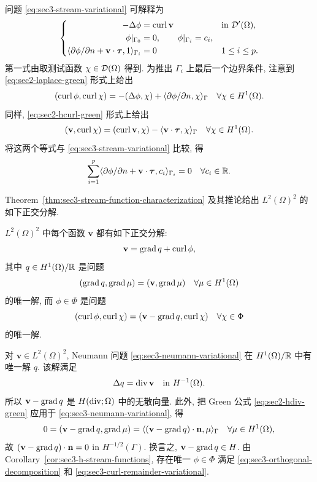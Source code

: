 \setcounter{statement}{0}
\begin{Remark}\label{rem:sec3-stream-boundary-problem}
问题 \eqref{eq:sec3-stream-variational} 可解释为
\[
\left\{\begin{aligned}
  -\Delta\phi&=\operatorname{curl}\mathbf v&&\text{in }\mathcal{D}'(\Omega),\\
  \phi|_{\Gamma_0}&=0,\qquad \phi|_{\Gamma_i}=c_i,\\
  \langle\partial\phi/\partial n+\mathbf v\cdot\boldsymbol\tau,1\rangle_{\Gamma_i}
    &=0&&1\le i\le p.
\end{aligned}\right.
\]
第一式由取测试函数 $\chi\in\mathcal{D}(\Omega)$ 得到. 为推出 $\Gamma_i$ 上最后一个边界条件,
注意到 \eqref{eq:sec2-laplace-green} 形式上给出
\[
  (\operatorname{curl}\phi,\operatorname{curl}\chi)=-(\Delta\phi,\chi)
  +\langle\partial\phi/\partial n,\chi\rangle_\Gamma
  \quad\forall\chi\in H^1(\Omega).
\]
同样, \eqref{eq:sec2-hcurl-green} 形式上给出
\[
  (\mathbf v,\operatorname{curl}\chi)=(\operatorname{curl}\mathbf v,\chi)
  -\langle\mathbf v\cdot\boldsymbol\tau,\chi\rangle_\Gamma
  \quad\forall\chi\in H^1(\Omega).
\]
将这两个等式与 \eqref{eq:sec3-stream-variational} 比较, 得
\[
  \sum_{i=1}^{p}
  \langle\partial\phi/\partial n+\mathbf v\cdot\boldsymbol\tau,c_i\rangle_{\Gamma_i}=0
  \quad\forall c_i\in\mathbb{R}.
\]
\end{Remark}

Theorem~\ref{thm:sec3-stream-function-characterization} 及其推论给出
$L^2(\Omega)^2$ 的如下正交分解.

\setcounter{statement}{1}
\begin{Theorem}\label{thm:sec3-orthogonal-decomposition}
$L^2(\Omega)^2$ 中每个函数 $\mathbf v$ 都有如下正交分解:
\begin{equation}\label{eq:sec3-orthogonal-decomposition}
  \mathbf v=\operatorname{grad} q+\operatorname{curl}\phi,
\end{equation}
其中 $q\in H^1(\Omega)/\mathbb{R}$ 是问题
\begin{equation}\label{eq:sec3-neumann-variational}
  (\operatorname{grad} q,\operatorname{grad}\mu)=(\mathbf v,\operatorname{grad}\mu)
  \quad\forall\mu\in H^1(\Omega)
\end{equation}
的唯一解, 而 $\phi\in\Phi$ 是问题
\begin{equation}\label{eq:sec3-curl-remainder-variational}
  (\operatorname{curl}\phi,\operatorname{curl}\chi)=(\mathbf v-\operatorname{grad} q,\operatorname{curl}\chi)
  \quad\forall\chi\in\Phi
\end{equation}
的唯一解.
\end{Theorem}

\begin{Proof}
对 $\mathbf v\in L^2(\Omega)^2$, Neumann 问题
\eqref{eq:sec3-neumann-variational} 在 $H^1(\Omega)/\mathbb{R}$ 中有唯一解 $q$.
该解满足
\[
  \Delta q=\operatorname{div}\mathbf v\quad\text{in }H^{-1}(\Omega).
\]
所以 $\mathbf v-\operatorname{grad} q$ 是 $H(\operatorname{div};\Omega)$ 中的无散向量. 此外, 把 Green 公式
\eqref{eq:sec2-hdiv-green} 应用于 \eqref{eq:sec3-neumann-variational}, 得
\[
  0=(\mathbf v-\operatorname{grad} q,\operatorname{grad}\mu)
  =\langle(\mathbf v-\operatorname{grad} q)\cdot\mathbf n,\mu\rangle_\Gamma
  \quad\forall\mu\in H^1(\Omega),
\]
故 $(\mathbf v-\operatorname{grad} q)\cdot\mathbf n=0$ in $H^{-1/2}(\Gamma)$.
换言之, $\mathbf v-\operatorname{grad} q\in H$. 由 Corollary~\ref{cor:sec3-h-stream-functions},
存在唯一 $\phi\in\Phi$ 满足 \eqref{eq:sec3-orthogonal-decomposition} 和
\eqref{eq:sec3-curl-remainder-variational}.
\end{Proof}

